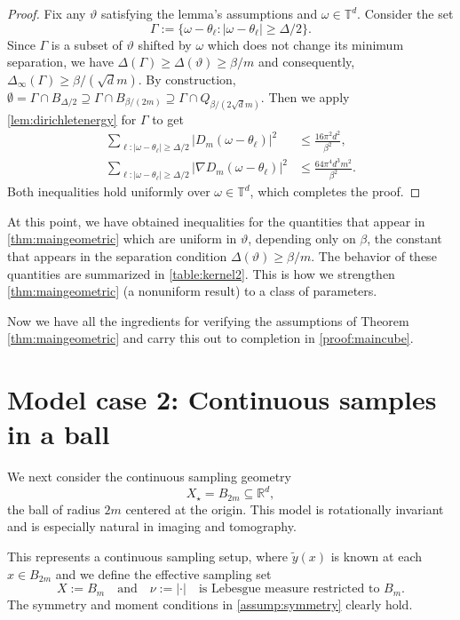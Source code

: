 \documentclass[11pt]{article}
\theoremstyle{definition}
\numberwithin{theorem}{section}
\numberwithin{lemma}{section}
\numberwithin{equation}{section}
\def\R{\mathbb{R}}
\def\T{\mathbb{T}}
\renewcommand{\supset}{\supseteq}
\renewcommand{\subset}{\subseteq}
\renewcommand{\tilde}{\widetilde}
\newcommand{\sampset}{X}
\def\andspace{\quad\text{and}\quad}
\numberwithin{equation}{section}
\begin{document}
	\begin{proof}
		Fix any $\vartheta$ satisfying the lemma's assumptions and $\omega\in\T^d$. Consider the set
		$$
		\Gamma:=\{\omega-\theta_\ell\colon |\omega-\theta_\ell|\geq \Delta/2\}.
		$$
		Since $\Gamma$ is a subset of $\vartheta$ shifted by $\omega$ which does not change its minimum separation, we have $\Delta(\Gamma)\geq \Delta(\vartheta)\geq \beta/m$ and consequently, $\Delta_\infty(\Gamma)\geq \beta/(\sqrt d m)$. By construction, $\emptyset=\Gamma\cap B_{\Delta/2}\supset \Gamma\cap B_{\beta/(2m)}\supset \Gamma \cap Q_{\beta/(2 \sqrt d m)}$. Then we apply \cref{lem:dirichletenergy} for $\Gamma$ to get
		\begin{align*}
			\sum_{\ell\colon |\omega-\theta_\ell|\geq \Delta/2}
			|D_m(\omega-\theta_\ell)|^2
			&\leq \frac{16\pi^2 d^2}{\beta^2}, \\
			\sum_{\ell\colon |\omega-\theta_\ell|\geq \Delta/2} |\nabla D_m(\omega-\theta_\ell)|^2
			&\leq \frac{64\pi^4 d^3 m^2}{\beta^2}. 
		\end{align*}
		Both inequalities hold uniformly over $\omega\in \T^d$, which completes the proof. 
	\end{proof}

	At this point, we have obtained inequalities for the quantities that appear in \cref{thm:maingeometric} which are uniform in $\vartheta$, depending only on $\beta$, the constant that appears in the separation condition $\Delta(\vartheta)\geq \beta/m$. The behavior of these quantities are summarized in \cref{table:kernel2}. This is how we strengthen \cref{thm:maingeometric} (a nonuniform result) to a class of parameters. 
	
	
	
Now we have all the ingredients for verifying the assumptions of Theorem \ref{thm:maingeometric} and carry this out to completion in \cref{proof:maincube}. 
	
	\section{Model case 2:  Continuous samples in a ball} 
	\label{sec:example2}
\label{sec:exam2}

We next consider the continuous sampling geometry
\[
\sampset_\star=B_{2m}\subset \R^d,
\]
the ball of radius $2m$ centered at the origin. This model is rotationally invariant and is especially natural in imaging and tomography. 

	This represents a continuous sampling setup, where $\tilde y(x)$ is known at each $x\in B_{2m}$ and
	we define the effective sampling set
		$$ 
		 \sampset:= B_m  \andspace 
\nu:=|\cdot| \quad \text{is Lebesgue measure restricted to $B_m$}.
		$$	
	The symmetry and moment conditions in \cref{assump:symmetry} clearly hold. 
	
\end{document}
